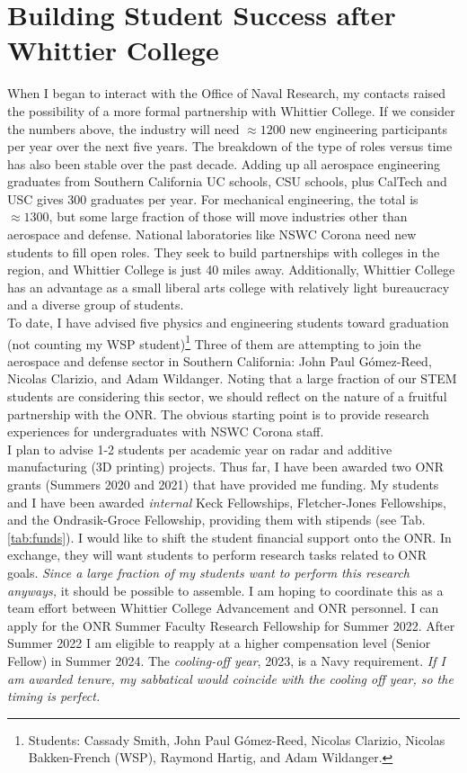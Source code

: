 \documentclass[../../../main.tex]{subfiles}
\begin{document}
\section{Building Student Success after Whittier College}

When I began to interact with the Office of Naval Research, my contacts raised the possibility of a more formal partnership with Whittier College.  If we consider the numbers above, the industry will need $\approx 1200$ new engineering participants per year over the next five years.  The breakdown of the type of roles versus time has also been stable over the past decade.  Adding up all aerospace engineering graduates from Southern California UC schools, CSU schools, plus CalTech and USC gives 300 graduates per year.  For mechanical engineering, the total is $\approx 1300$, but some large fraction of those will move industries other than aerospace and defense.  National laboratories like NSWC Corona need new students to fill open roles.  They seek to build partnerships with colleges in the region, and Whittier College is just 40 miles away.  Additionally, Whittier College has an advantage as a small liberal arts college with relatively light bureaucracy and a diverse group of students.
\\
\vspace{0.25cm}
To date, I have advised five physics and engineering students toward graduation (not counting my WSP student)\footnote{Students: Cassady Smith, John Paul G\'{o}mez-Reed, Nicolas Clarizio, Nicolas Bakken-French (WSP), Raymond Hartig, and Adam Wildanger.}  Three of them are attempting to join the aerospace and defense sector in Southern California: John Paul G\'{o}mez-Reed, Nicolas Clarizio, and Adam Wildanger.  Noting that a large fraction of our STEM students are considering this sector, we should reflect on the nature of a fruitful partnership with the ONR.  The obvious starting point is to provide research experiences for undergraduates with NSWC Corona staff.  
\\
\vspace{0.25cm}
I plan to advise 1-2 students per academic year on radar and additive manufacturing (3D printing) projects.  Thus far, I have been awarded two ONR grants (Summers 2020 and 2021) that have provided me funding.  My students and I have been awarded \textit{internal} Keck Fellowships, Fletcher-Jones Fellowships, and the Ondrasik-Groce Fellowship, providing them with stipends (see Tab. \ref{tab:funds}).  I would like to shift the student financial support onto the ONR.  In exchange, they will want students to perform research tasks related to ONR goals.  \textit{Since a large fraction of my students want to perform this research anyways,} it should be possible to assemble.  I am hoping to coordinate this as a team effort between Whittier College Advancement and ONR personnel.  I can apply for the ONR Summer Faculty Research Fellowship for Summer 2022.  After Summer 2022 I am eligible to reapply at a higher compensation level (Senior Fellow) in Summer 2024.  The \textit{cooling-off year}, 2023, is a Navy requirement.  \textit{If I am awarded tenure, my sabbatical would coincide with the cooling off year, so the timing is perfect.}
\end{document}

